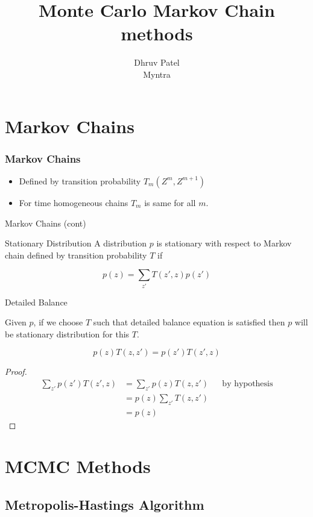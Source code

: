 \documentclass[pdf]{beamer}
\title{Monte Carlo Markov Chain methods}
\author[Dhruv Patel]{Dhruv Patel \\ Myntra}
\begin{document}
\begin{frame}
  \titlepage
\end{frame}

\section{Markov Chains}
\begin{frame}
  \frametitle{Markov Chains}
  \begin{itemize}
  \item  Defined by transition probability $T_m(Z^m, Z^{m+1})$
  \item For time homogeneous chains $T_m$ is same for all $m$.
  \end{itemize}
\end{frame}

\begin{frame}{Markov Chains (cont)}
  \begin{block}{Stationary Distribution}
    A distribution $p$ is stationary with respect to Markov chain defined by transition probability $T$ if
    
    \[
      p(z) = \sum_{z'}T(z', z) p(z')
    \]
  \end{block}
\end{frame}

\begin{frame}{Detailed Balance}

  \begin{theorem}
    Given $p$, if we choose $T$ such that detailed balance equation is satisfied then $p$ will be stationary distribution for this $T$.
    
    \[
      p(z)T(z, z') = p(z')T(z', z)  
    \]
  \end{theorem}
  \begin{proof}
    \begin{align*}
      \sum_{z'} p(z') T(z', z) &= \sum_{z'} p(z) T(z, z')  && \text{by hypothesis} \\
                               &= p(z) \sum_{z'}T(z, z') \\
                               &= p(z)
    \end{align*}
  \end{proof}
\end{frame}

\section{MCMC Methods}
\subsection{Metropolis-Hastings Algorithm}
\end{document}
